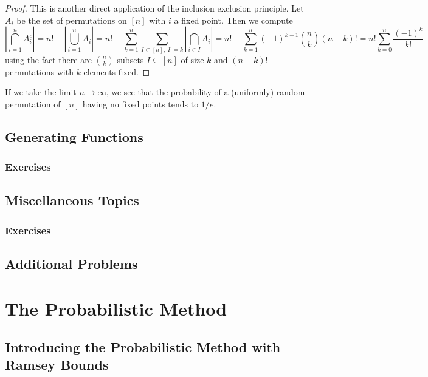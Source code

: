 \documentclass{article}
\begin{document}
\begin{proof}
    This is another direct application of the inclusion exclusion principle. Let $A_i$ be the set of permutations 
    on $[n]$ with $i$ a fixed point. Then we compute
    \[
        \left|\bigcap_{i=1}^n A_i^c\right| = n! - \left|\bigcup_{i = 1}^n A_i\right| = n! - \sum_{k=1}^n
        \sum_{I \subset [n], |I| = k}\left|\bigcap_{i \in I}A_i\right| = n! - \sum_{k=1}^n (-1)^{k-1}\binom{n}{k}(n-k)! 
        = n! \sum_{k=0}^n \frac{(-1)^k}{k!}
    \]
    using the fact there are $\binom{n}{k}$ subsets $I \subseteq [n]$ of size $k$ and $(n-k)!$ permutations 
    with $k$ elements fixed. 
\end{proof}

If we take the limit $n \to \infty$, we see that the probability of a (uniformly) random permutation of $[n]$ having
no fixed points tends to $1/e$. 

\newpage

\subsection{Generating Functions}

\subsubsection*{Exercises}

\newpage 

\subsection{Miscellaneous Topics}

\subsubsection*{Exercises}

\newpage

\subsection{Additional Problems}

\newpage

\section{The Probabilistic Method}

\subsection{Introducing the Probabilistic Method with Ramsey Bounds}
\end{document}
